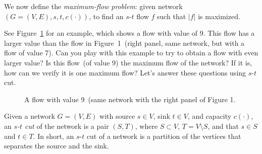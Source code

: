We now define the \emph{maximum-flow problem}: given network $(G= (V, E), s, t, c(\cdot))$,
to find an $s$-$t$ flow $f$ such that $|f|$ is maximized.

See Figure~\ref{fig:maxflow} for an example, which shows a flow with value 
of 9. This flow has a larger value than the flow in Figure~1~(right panel,
same network, but with a flow of value 7).
Can you play with this example to try to obtain a flow with even larger value?
Is this flow~(of value 9) the maximum flow of the network?
If it is, how can we verify it is one maximum flow?
Let's answer these questions using $s$-$t$ cut.


\begin{figure}[h]
\centering{}
\caption{A flow with value 9~(same network with the right panel of Figure 1.}
\label{fig:maxflow}
\end{figure}



Given a network $G=(V, E)$ with source $s\in V$, sink $t\in V$, and capacity $c(\cdot)$,
an \emph{$s$-$t$ cut} of the network is a pair $(S, T)$, where $S\subset V$, $T = V\setminus S$,
and that $s\in S$ and $t\in T$. In short, an $s$-$t$ cut of a network is a partition
of the vertices that separates the source and the sink.

